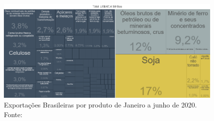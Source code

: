 \begin{figure}[h]
    \centering
    \includegraphics[scale=0.65]{Imagens/ComexStat.PNG}
    \caption{Exportações Brasileiras por produto de Janeiro a junho de 2020. \newline Fonte: \cite{ComexStat}}
\end{figure}